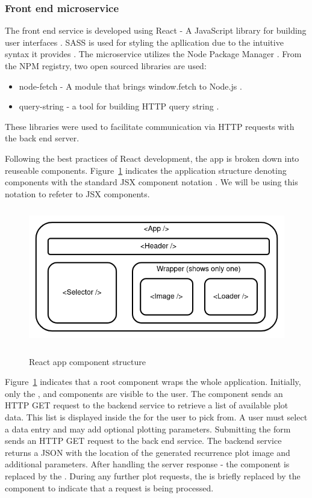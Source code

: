 \documentclass[a4paper,12pt,fleqn]{article}
\begin{document}
\subsubsection{Front end microservice}
The front end service is developed using React - A JavaScript library for building user interfaces \cite{react_home}.
SASS is used for styling the apllication due to the intuitive syntax it provides \cite{sass}.
The microservice utilizes the Node Package Manager \cite{npm}.
From the NPM registry, two open sourced libraries are used:
\begin{itemize}
  \item node-fetch - A module that brings window.fetch to Node.js \cite{node-fetch}.
  \item query-string - a tool for building HTTP query string \cite{query-string}.
\end{itemize}
These libraries were used to facilitate communication via HTTP requests with the back end server.

Following the best practices of React development, the app is broken down into reuseable components.
Figure~\ref{fig:react_component_structure} indicates the application structure denoting components with the standard JSX component notation
. We will be using this notation to refeter to JSX components.
\begin{figure}[h]
  \centering
  {\includegraphics[height=6cm]{assets/react_component_structure.png}}
  \caption{React app component structure}
  \label{fig:react_component_structure}
\end{figure}

Figure~\ref{fig:react_component_structure} indicates that a root  component wraps the whole application.
Initially, only the ,  and  components are visible to the user.
The  component sends an HTTP GET request to the backend service to retrieve a list of available plot data.
This list is displayed inside the  for the user to pick from.
A user must select a data entry and may add optional plotting parameters.
Submitting the  form sends an HTTP GET request to the back end service.
The backend service returns a JSON with the location of the generated recurrence plot image and additional parameters.
After handling the server response - the  component is replaced by the .
During any further plot requests, the  is briefly replaced by the  component to indicate that a request is being processed.
\end{document}
